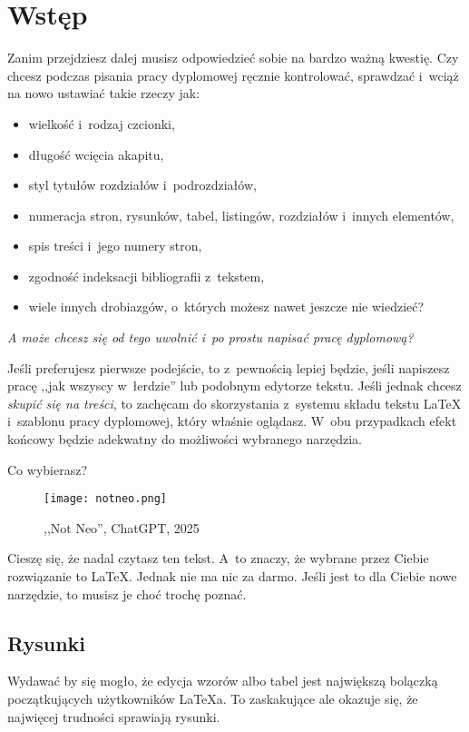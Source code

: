 \chapter{Wstęp}
\label{ch:wstep}

Zanim przejdziesz dalej musisz odpowiedzieć sobie na bardzo ważną kwestię. Czy chcesz podczas pisania pracy dyplomowej ręcznie kontrolować, sprawdzać i~wciąż na nowo ustawiać takie rzeczy jak:

\begin{itemize}
	\item wielkość i~rodzaj czcionki,
	\item długość wcięcia akapitu,
	\item styl tytułów rozdziałów i~podrozdziałów,
	\item numeracja stron, rysunków, tabel, listingów, rozdziałów i~innych elementów,
	\item spis treści i~jego numery stron,
	\item zgodność indeksacji bibliografii z~tekstem,
	\item wiele innych drobiazgów, o~których możesz nawet jeszcze nie wiedzieć?
\end{itemize}

\textit{A może chcesz się od tego uwolnić i~po prostu napisać pracę dyplomową?}

Jeśli preferujesz pierwsze podejście, to z~pewnością lepiej będzie, jeśli napiszesz pracę ,,jak wszyscy w~łerdzie'' lub podobnym edytorze tekstu. Jeśli jednak chcesz \textit{skupić się na treści}, to zachęcam do skorzystania z~systemu składu tekstu \LaTeX{} i~szablonu pracy dyplomowej, który właśnie oglądasz. W~obu przypadkach efekt końcowy będzie adekwatny do możliwości wybranego narzędzia.

Co wybierasz?

\begin{figure}[!htbp]
	\centering \texttt{[image: notneo.png]} %
	\caption{,,Not Neo'', ChatGPT, 2025}
	\label{rys:notneo}
\end{figure}

Cieszę się, że nadal czytasz ten tekst. A~to znaczy, że wybrane przez Ciebie rozwiązanie to \LaTeX. Jednak nie ma nic za darmo. Jeśli jest to dla Ciebie nowe narzędzie, to musisz je choć trochę poznać.

\section{Rysunki}
Wydawać by się mogło, że edycja wzorów albo tabel jest największą bolączką początkujących użytkowników \LaTeX{a}. To zaskakujące ale okazuje się, że najwięcej trudności sprawiają rysunki.

